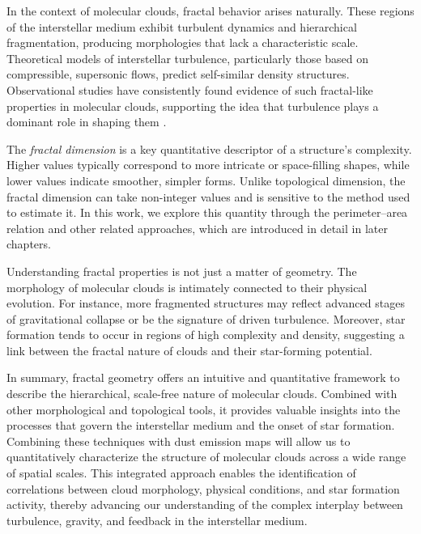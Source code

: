 In the context of molecular clouds, fractal behavior arises naturally. These regions of the interstellar medium exhibit turbulent dynamics and hierarchical fragmentation, producing morphologies that lack a characteristic scale. Theoretical models of interstellar turbulence, particularly those based on compressible, supersonic flows, predict self-similar density structures. Observational studies have consistently found evidence of such fractal-like properties in molecular clouds, supporting the idea that turbulence plays a dominant role in shaping them \cite{elmegreen1996fractal, falgarone1991hierarchical}.

The \emph{fractal dimension} is a key quantitative descriptor of a structure's complexity. Higher values typically correspond to more intricate or space-filling shapes, while lower values indicate smoother, simpler forms. Unlike topological dimension, the fractal dimension can take non-integer values and is sensitive to the method used to estimate it. In this work, we explore this quantity through the perimeter–area relation and other related approaches, which are introduced in detail in later chapters.

Understanding fractal properties is not just a matter of geometry. The morphology of molecular clouds is intimately connected to their physical evolution. For instance, more fragmented structures may reflect advanced stages of gravitational collapse or be the signature of driven turbulence. Moreover, star formation tends to occur in regions of high complexity and density, suggesting a link between the fractal nature of clouds and their star-forming potential.

In summary, fractal geometry offers an intuitive and quantitative framework to describe the hierarchical, scale-free nature of molecular clouds. Combined with other morphological and topological tools, it provides valuable insights into the processes that govern the interstellar medium and the onset of star formation. Combining these techniques with dust emission maps will allow us to quantitatively characterize the structure of molecular clouds across a wide range of spatial scales. This integrated approach enables the identification of correlations between cloud morphology, physical conditions, and star formation activity, thereby advancing our understanding of the complex interplay between turbulence, gravity, and feedback in the interstellar medium.